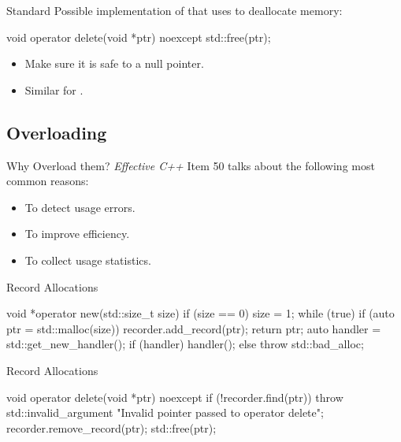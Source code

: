 \documentclass{beamer}
\begin{document}
\begin{frame}[fragile]{Standard }
  Possible implementation of  that uses  to deallocate memory:
  \begin{cpp}
void operator delete(void *ptr) noexcept {
  std::free(ptr);
}
  \end{cpp}
  \begin{itemize}
    \item Make sure it is safe to  a null pointer.
    \item Similar for \ttt{[]}.
  \end{itemize}
\end{frame}

\subsection{Overloading}

\begin{frame}{Why Overload them?}
  \textit{Effective C++} Item 50 talks about the following most common reasons:
  \begin{itemize}
    \item To detect usage errors.
    \item To improve efficiency.
    \item To collect usage statistics.
  \end{itemize}
\end{frame}

\begin{frame}[fragile]{Record Allocations}
  \begin{cpp}
void *operator new(std::size_t size) {
  if (size == 0)
    size = 1;
  while (true) {
    if (auto ptr = std::malloc(size)) {
      recorder.add_record(ptr);
      return ptr;
    }
    auto handler = std::get_new_handler();
    if (handler)
      handler();
    else
      throw std::bad_alloc{};
  }
}
  \end{cpp}
\end{frame}

\begin{frame}[fragile]{Record Allocations}
  \begin{cpp}
void operator delete(void *ptr) noexcept {
  if (!recorder.find(ptr))
    throw std::invalid_argument
        {"Invalid pointer passed to operator delete"};
  recorder.remove_record(ptr);
  std::free(ptr);
}
  \end{cpp}
\end{frame}
\end{document}
